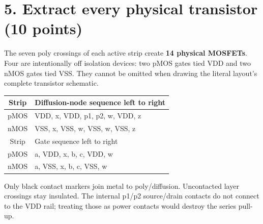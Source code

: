 \documentclass[10pt]{article}
\begin{document}
\newpage\section*{5. Extract every physical transistor (10 points)}
The seven poly crossings of each active strip create \textbf{14 physical MOSFETs}. Four are intentionally off isolation devices: two pMOS gates tied VDD and two nMOS gates tied VSS. They cannot be omitted when drawing the literal layout's complete transistor schematic.
\begin{center}\begin{tabular}{cl}\toprule Strip&Diffusion-node sequence left to right\\\midrule
pMOS&VDD, x, VDD, p1, p2, w, VDD, z\\
nMOS&VSS, x, VSS, w, VSS, w, VSS, z\\\midrule
Strip&Gate sequence left to right\\\midrule
pMOS&a, VDD, x, b, c, VDD, w\\
nMOS&a, VSS, x, b, c, VSS, w\\\bottomrule\end{tabular}\end{center}
Only black contact markers join metal to poly/diffusion. Uncontacted layer crossings stay insulated. The internal p1/p2 source/drain contacts do not connect to the VDD rail; treating those as power contacts would destroy the series pull-up.
\providecommand{\auditmos}[4]{\begin{scope}[shift={(#1,#2)}]
\draw (0,.24)--(0,-.24);\draw (0,.20)--(.25,.20)--(.25,.5);
\draw (0,-.20)--(.25,-.20)--(.25,-.5);\draw (-.16,.23)--(-.16,-.23);
\ifnum#4=1\draw (-.26,0) circle (.06);\draw (-.75,0)--(-.32,0);
\else\draw (-.75,0)--(-.16,0);\fi
\node[anchor=east] at (-.76,0) {$#3$};\end{scope}}
\end{document}
